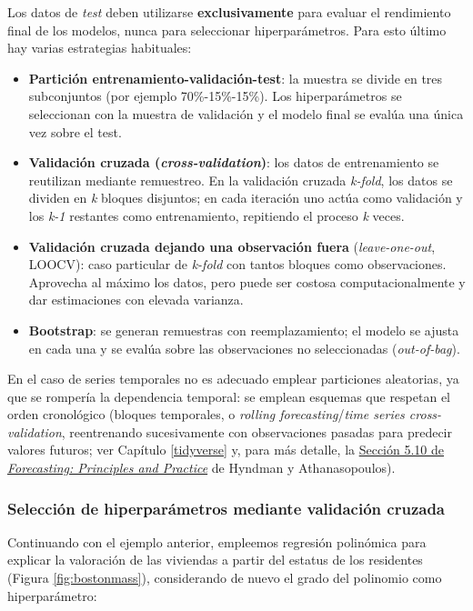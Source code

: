\documentclass[
]{book}
\theoremstyle{break}
\theoremstyle{nonumberplain}
\begin{document}
Los datos de \emph{test} deben utilizarse \textbf{exclusivamente} para evaluar el rendimiento final de los modelos, nunca para seleccionar hiperparámetros. Para esto último hay varias estrategias habituales:

\begin{itemize}
\item
  \textbf{Partición entrenamiento-validación-test}: la muestra se divide en tres subconjuntos (por ejemplo 70\%-15\%-15\%). Los hiperparámetros se seleccionan con la muestra de validación y el modelo final se evalúa una única vez sobre el test.
\item
  \textbf{Validación cruzada (\emph{cross-validation})}: los datos de entrenamiento se reutilizan mediante remuestreo. En la validación cruzada \emph{k-fold}, los datos se dividen en \emph{k} bloques disjuntos; en cada iteración uno actúa como validación y los \emph{k-1} restantes como entrenamiento, repitiendo el proceso \emph{k} veces.
\item
  \textbf{Validación cruzada dejando una observación fuera} (\emph{leave-one-out}, LOOCV): caso particular de \emph{k-fold} con tantos bloques como observaciones. Aprovecha al máximo los datos, pero puede ser costosa computacionalmente y dar estimaciones con elevada varianza.
\item
  \textbf{Bootstrap}: se generan remuestras con reemplazamiento; el modelo se ajusta en cada una y se evalúa sobre las observaciones no seleccionadas (\emph{out-of-bag}).
\end{itemize}

En el caso de series temporales no es adecuado emplear particiones aleatorias, ya que se rompería la dependencia temporal: se emplean esquemas que respetan el orden cronológico (bloques temporales, o \emph{rolling forecasting}/\emph{time series cross-validation}, reentrenando sucesivamente con observaciones pasadas para predecir valores futuros; ver Capítulo \ref{tidyverse} y, para más detalle, la \href{https://otexts.com/fpp3/tscv.html}{Sección 5.10 de \emph{Forecasting: Principles and Practice}} de Hyndman y Athanasopoulos).

\subsubsection{Selección de hiperparámetros mediante validación cruzada}\label{cv}

Continuando con el ejemplo anterior, empleemos regresión polinómica para explicar la valoración de las viviendas a partir del estatus de los residentes (Figura \ref{fig:bostonmass}), considerando de nuevo el grado del polinomio como hiperparámetro:
\end{document}
